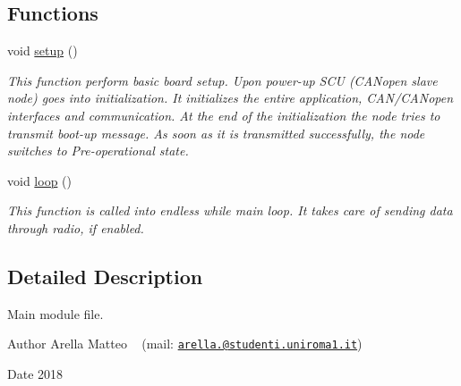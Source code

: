 \subsection*{Functions}
\begin{DoxyCompactItemize}
\item 
void \mbox{\hyperlink{group___main__group__module_ga4fc01d736fe50cf5b977f755b675f11d}{setup}} ()
\begin{DoxyCompactList}\small\item\em This function perform basic board setup. Upon power-\/up S\+CU (C\+A\+Nopen slave node) goes into initialization. It initializes the entire application, C\+A\+N/\+C\+A\+Nopen interfaces and communication. At the end of the initialization the node tries to transmit boot-\/up message. As soon as it is transmitted successfully, the node switches to Pre-\/operational state. \end{DoxyCompactList}\item 
void \mbox{\hyperlink{group___main__group__module_gafe461d27b9c48d5921c00d521181f12f}{loop}} ()
\begin{DoxyCompactList}\small\item\em This function is called into endless while main loop. It takes care of sending data through radio, if enabled. \end{DoxyCompactList}\end{DoxyCompactItemize}


\subsection{Detailed Description}
Main module file. 

\begin{DoxyAuthor}{Author}
Arella Matteo ~\newline
 (mail\+: \href{mailto:arella.1646983@studenti.uniroma1.it}{\tt arella.@studenti.\+uniroma1.\+it}) 
\end{DoxyAuthor}
\begin{DoxyDate}{Date}
2018 
\end{DoxyDate}
